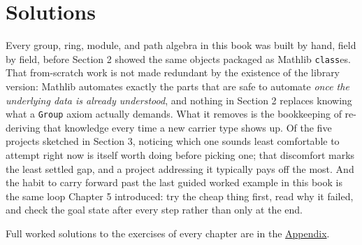 \section{Solutions}\label{sec:14-next-steps:04-solutions:1}

Every group, ring, module, and path algebra in this book was built by hand, field by field, before Section 2 showed the same objects packaged as Mathlib \texttt{class}es. That from-scratch work is not made redundant by the existence of the library version: Mathlib automates exactly the parts that are safe to automate \emph{once the underlying data is already understood}, and nothing in Section 2 replaces knowing what a \texttt{Group} axiom actually demands. What it removes is the bookkeeping of re-deriving that knowledge every time a new carrier type shows up. Of the five projects sketched in Section 3, noticing which one sounds least comfortable to attempt right now is itself worth doing before picking one; that discomfort marks the least settled gap, and a project addressing it typically pays off the most. And the habit to carry forward past the last guided worked example in this book is the same loop Chapter 5 introduced: try the cheap thing first, read why it failed, and check the goal state after every step rather than only at the end.

Full worked solutions to the exercises of every chapter are in the \hyperref[sec:15-appendix-solutions:00-index:1]{Appendix}.
